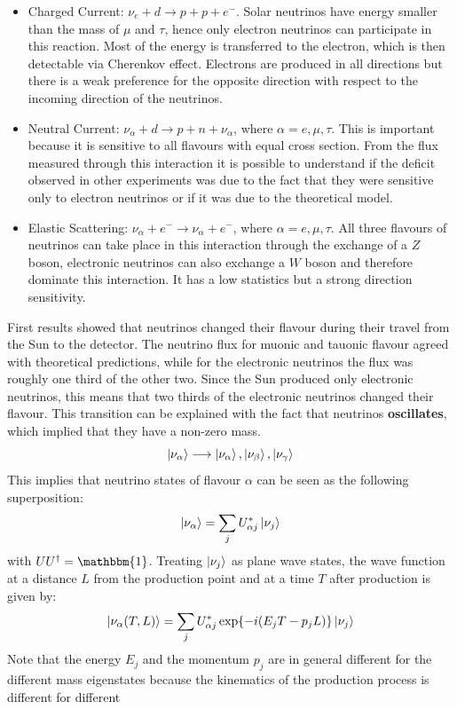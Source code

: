 \documentclass[10.75pt,a4paper,openright,bottom=2cm]{article}
\begin{document}
\begin{itemize}
    \item Charged Current: $\nu_e+d\to p+p+e^-$. Solar neutrinos have energy smaller than the mass of $\mu$ and $\tau$, hence only electron neutrinos can participate in this reaction. Most of the energy is transferred to the electron, which is then detectable via Cherenkov effect. Electrons are produced in all directions but there is a weak preference for the opposite direction with respect to the incoming direction of the neutrinos.
    \item Neutral Current: $\nu_\alpha+d\to p+n+\nu_\alpha$, where $\alpha=e,\mu,\tau$. This is important because it is sensitive to all flavours with equal cross section. From the flux measured through this interaction it is possible to understand if the deficit observed in other experiments was due to the fact that they were sensitive only to electron neutrinos or if it was due to the theoretical model.
    \item Elastic Scattering: $\nu_\alpha+e^-\to\nu_\alpha+e^-$, where $\alpha=e,\mu,\tau$. All three flavours of neutrinos can take place in this interaction through the exchange of a $Z$ boson, electronic neutrinos can also exchange a $W$ boson and therefore dominate this interaction. It has a low statistics but a strong direction sensitivity. 
\end{itemize}
First results showed that neutrinos changed their flavour during their travel from the Sun to the detector. The neutrino flux for muonic and tauonic flavour agreed with theoretical predictions, while for the electronic neutrinos the flux was roughly one third of the other two. Since the Sun produced only electronic neutrinos, this means that two thirds of the electronic neutrinos changed their flavour. This transition can be explained with the fact that neutrinos \textbf{oscillates}, which implied that they have a non-zero mass.
\[
\ket{\nu_\alpha}\longrightarrow\ket{\nu_\alpha},\ket{\nu_\beta},\ket{\nu_\gamma}
\]
This implies that neutrino states of flavour $\alpha$ can be seen as the following superposition:
\[
\ket{\nu_\alpha}=\sum_jU_{\alpha j}^*\ket{\nu_j}
\]
with $UU^\dagger=\mathbbm{1}$. Treating $\ket{\nu_j}$ as plane wave states, the wave function at a distance
$L$ from the production point and at a time $T$ after production is given by:
\[
\ket{\nu_\alpha(T,L)}=\sum_jU^*_{\alpha j}\exp{-i(E_jT-p_jL)}\ket{\nu_j}
\]
Note that the energy $E_j$ and the momentum $p_j$ are in general different for the different
mass eigenstates because the kinematics of the production process is different for different
\end{document}

